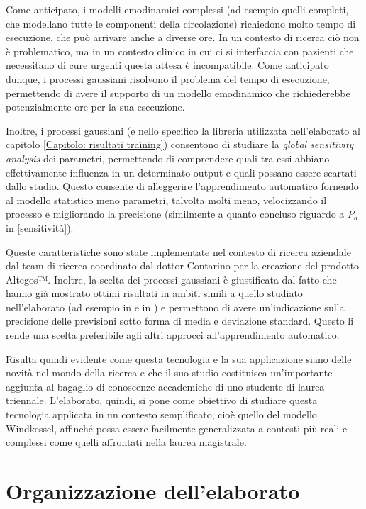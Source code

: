 Come anticipato, i modelli emodinamici complessi (ad esempio quelli completi, che modellano tutte le componenti della circolazione) richiedono molto tempo di esecuzione, che può arrivare anche a diverse ore. In un contesto di ricerca ciò non è problematico, ma in un contesto clinico in cui ci si interfaccia con pazienti che necessitano di cure urgenti questa attesa è incompatibile. Come anticipato dunque, i processi gaussiani risolvono il problema del tempo di esecuzione, permettendo di avere il supporto di un modello emodinamico che richiederebbe potenzialmente ore per la sua esecuzione.

Inoltre, i processi gaussiani (e nello specifico la libreria utilizzata nell'elaborato al capitolo \ref{Capitolo: risultati training}) consentono di studiare la \textit{global sensitivity analysis} dei parametri, permettendo di comprendere quali tra essi abbiano effettivamente influenza in un determinato output e quali possano essere scartati dallo studio. Questo consente di alleggerire l'apprendimento automatico fornendo al modello statistico meno parametri, talvolta molti meno, velocizzando il processo e migliorando la precisione (similmente a quanto concluso riguardo a $P_d$ in \ref{sensitività}).

Queste caratteristiche sono state implementate nel contesto di ricerca aziendale dal team di ricerca coordinato dal dottor Contarino per la creazione del prodotto Altegos™. Inoltre, la scelta dei processi gaussiani è giustificata dal fatto che hanno già mostrato ottimi risultati in ambiti simili a quello studiato nell'elaborato (ad esempio in \cite{doi:10.1098/rsta.2019.0334} e in \cite{Yuhn2022.03.10.483573}) e permettono di avere un'indicazione sulla precisione delle previsioni sotto forma di media e deviazione standard. Questo li rende una scelta preferibile agli altri approcci all'apprendimento automatico.


Risulta quindi evidente come questa tecnologia e la sua applicazione siano delle novità nel mondo della ricerca e che il suo studio costituisca un'importante aggiunta al bagaglio di conoscenze accademiche di uno studente di laurea triennale. L'elaborato, quindi, si pone come obiettivo di studiare questa tecnologia applicata in un contesto semplificato, cioè quello del modello Windkessel, affinché possa essere facilmente generalizzata a contesti più reali e complessi come quelli affrontati nella laurea magistrale. 

\newpage
\section{Organizzazione dell'elaborato}
